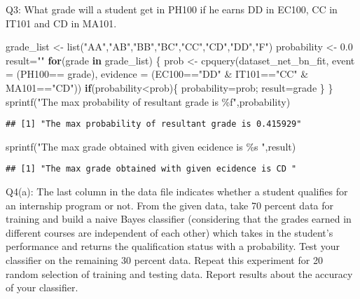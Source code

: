 \documentclass[
]{article}
\newenvironment{Shaded}{\begin{snugshade}}{\end{snugshade}}
\newcommand{\AttributeTok}[1]{\textcolor[rgb]{0.77,0.63,0.00}{#1}}
\newcommand{\ControlFlowTok}[1]{\textcolor[rgb]{0.13,0.29,0.53}{\textbf{#1}}}
\newcommand{\FloatTok}[1]{\textcolor[rgb]{0.00,0.00,0.81}{#1}}
\newcommand{\FunctionTok}[1]{\textcolor[rgb]{0.00,0.00,0.00}{#1}}
\newcommand{\NormalTok}[1]{#1}
\newcommand{\OtherTok}[1]{\textcolor[rgb]{0.56,0.35,0.01}{#1}}
\newcommand{\SpecialCharTok}[1]{\textcolor[rgb]{0.00,0.00,0.00}{#1}}
\newcommand{\StringTok}[1]{\textcolor[rgb]{0.31,0.60,0.02}{#1}}
\begin{document}
Q3: What grade will a student get in PH100 if he earns DD in EC100, CC
in IT101 and CD in MA101.

\begin{Shaded}
\begin{Highlighting}[]
\NormalTok{grade\_list }\OtherTok{\textless{}{-}} \FunctionTok{list}\NormalTok{(}\StringTok{"AA"}\NormalTok{,}\StringTok{"AB"}\NormalTok{,}\StringTok{"BB"}\NormalTok{,}\StringTok{"BC"}\NormalTok{,}\StringTok{"CC"}\NormalTok{,}\StringTok{"CD"}\NormalTok{,}\StringTok{"DD"}\NormalTok{,}\StringTok{"F"}\NormalTok{)}
\NormalTok{probability }\OtherTok{\textless{}{-}} \FloatTok{0.0}
\NormalTok{result}\OtherTok{=}\StringTok{""}
\ControlFlowTok{for}\NormalTok{(grade }\ControlFlowTok{in}\NormalTok{ grade\_list) \{}
\NormalTok{  prob }\OtherTok{\textless{}{-}} \FunctionTok{cpquery}\NormalTok{(dataset\_net\_bn\_fit, }\AttributeTok{event =}\NormalTok{ (PH100}\SpecialCharTok{==}\NormalTok{ grade), }\AttributeTok{evidence =}\NormalTok{ (EC100}\SpecialCharTok{==}\StringTok{"DD"} \SpecialCharTok{\&}\NormalTok{ IT101}\SpecialCharTok{==}\StringTok{"CC"} \SpecialCharTok{\&}\NormalTok{ MA101}\SpecialCharTok{==}\StringTok{"CD"}\NormalTok{))}
  \ControlFlowTok{if}\NormalTok{(probability}\SpecialCharTok{\textless{}}\NormalTok{prob)\{}
\NormalTok{    probability}\OtherTok{=}\NormalTok{prob;}
\NormalTok{    result}\OtherTok{=}\NormalTok{grade}
\NormalTok{  \}}
\NormalTok{\}}
\FunctionTok{sprintf}\NormalTok{(}\StringTok{"The max probability of resultant grade is \%f"}\NormalTok{,probability)}
\end{Highlighting}
\end{Shaded}

\begin{verbatim}
## [1] "The max probability of resultant grade is 0.415929"
\end{verbatim}

\begin{Shaded}
\begin{Highlighting}[]
\FunctionTok{sprintf}\NormalTok{(}\StringTok{"The max grade obtained with given ecidence is \%s "}\NormalTok{,result)}
\end{Highlighting}
\end{Shaded}

\begin{verbatim}
## [1] "The max grade obtained with given ecidence is CD "
\end{verbatim}

Q4(a): The last column in the data file indicates whether a student
qualifies for an internship program or not. From the given data, take 70
percent data for training and build a naive Bayes classifier
(considering that the grades earned in different courses are independent
of each other) which takes in the student's performance and returns the
qualification status with a probability. Test your classifier on the
remaining 30 percent data. Repeat this experiment for 20 random
selection of training and testing data. Report results about the
accuracy of your classifier.
\end{document}
